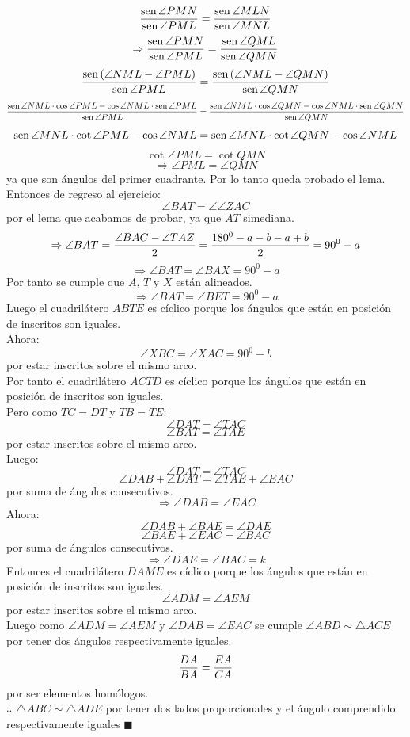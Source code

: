 \documentclass{book}
\newcommand{\sen}{\mathop{\rm sen}\nolimits} %
\begin{document}
\begin{enumerate}
        $$\frac{\sen {\angle PMN}}{\sen {\angle PML}}=\frac{\sen {\angle MLN}}{\sen {\angle MNL}}$$
        $$\Rightarrow\frac{\sen {\angle PMN}}{\sen {\angle PML}}=\frac{\sen {\angle QML}}{\sen {\angle QMN}}$$
        $$\frac{\sen {(\angle NML-\angle PML)}}{\sen {\angle PML}}=\frac{\sen {(\angle NML-\angle QMN)}}{\sen {\angle QMN}}$$
        $$\frac{\sen{\angle NML}\cdot\cos{\angle PML}-\cos{\angle NML}\cdot\sen{\angle PML}}{\sen{\angle PML}}=\frac{\sen{\angle NML}\cdot\cos{\angle QMN}-\cos{\angle NML}\cdot\sen{\angle QMN}}{\sen{\angle QMN}}$$
        $$\sen{\angle MNL}\cdot\cot{\angle PML}-\cos{\angle NML}=\sen{\angle MNL}\cdot\cot{\angle QMN}-\cos{\angle NML}$$
        $$\cot{\angle PML}=\cot{QMN}$$
        $$\Rightarrow\angle PML=\angle QMN$$
        ya que son ángulos del primer cuadrante. Por lo tanto queda probado el lema.\\
        Entonces de regreso al ejercicio:
        $$\angle BAT=\angle\angle ZAC$$
        por el lema que acabamos de probar, ya que $AT$ simediana.
        $$\Rightarrow\angle BAT={\angle BAC-\angle TAZ\over 2}={180^0-a-b-a+b\over 2}=90^0-a$$
        $$\Rightarrow\angle BAT=\angle BAX=90^0-a$$
        Por tanto se cumple que $A$, $T$ y $X$ están alineados.
        $$\Rightarrow\angle BAT=\angle BET=90^0-a$$
        Luego el cuadrilátero $ABTE$ es cíclico porque los ángulos que están en posición de inscritos son iguales.\\
        Ahora:
        $$\angle XBC=\angle XAC=90^0-b$$
        por estar inscritos sobre el mismo arco.\\
        Por tanto el cuadrilátero $ACTD$ es cíclico porque los ángulos que están en posición de inscritos son iguales. \\
        Pero como $TC=DT$ y $TB=TE$:
        $$\angle DAT=\angle TAC$$
        $$\angle BAT=\angle TAE$$
        por estar inscritos sobre el mismo arco.\\
        Luego:
        $$\angle DAT=\angle TAC$$
        $$\angle DAB+\angle DAT=\angle TAE+\angle EAC$$
        por suma de ángulos consecutivos.
        $$\Rightarrow\angle DAB=\angle EAC$$
        Ahora:
        $$\angle DAB+\angle BAE=\angle DAE$$
        $$\angle BAE+\angle EAC=\angle BAC$$
        por suma de ángulos consecutivos.
        $$\Rightarrow\angle DAE=\angle BAC=k$$
        Entonces el cuadrilátero $DAME$ es cíclico porque los ángulos que están en posición de inscritos son iguales.
        $$\angle ADM=\angle AEM$$
        por estar inscritos sobre el mismo arco.\\
        Luego como $\angle ADM=\angle AEM$ y $\angle DAB=\angle EAC$ se cumple $\angle ABD\sim\triangle ACE$ por tener dos ángulos respectivamente iguales.
        $${DA\over BA}={EA\over CA}$$
        por ser elementos homólogos.\\
        $\therefore$ $\triangle ABC\sim\triangle ADE$ por tener dos lados proporcionales y el ángulo comprendido respectivamente iguales $\blacksquare$\\

    \end{enumerate}
\end{document}
